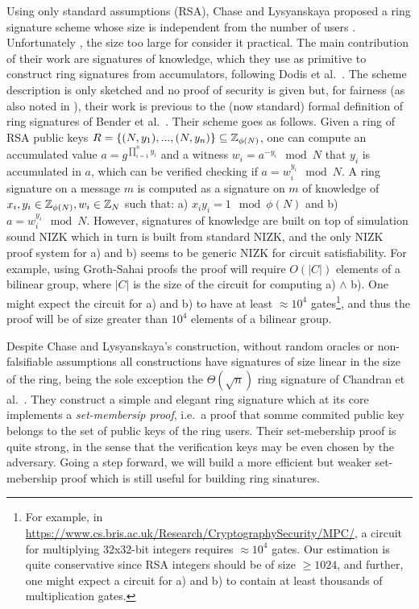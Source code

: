 Using only standard assumptions (RSA), Chase and Lysyanskaya proposed a ring signature scheme whose size is independent from the number of users \cite{C:ChaLys06}. Unfortunately , the size too large for consider it practical.
The main contribution of their work are
signatures of knowledge, which they use as primitive to construct ring signatures from accumulators, following Dodis et al.~\cite{EC:DKNS04}. The scheme description is only sketched and no proof of security is given but, for fairness (as also noted in \cite{AC:MalSch17}), their work is previous to the (now standard) formal definition of ring signatures of Bender et al.~\cite{TCC:BenKatMor06}. Their scheme goes as follows.
Given a ring of RSA public keys $R = \{(N,y_1),...,(N,y_n)\}\subseteq \mathbb{Z}_{\phi(N)}$, one can compute an accumulated value $a = g^{\prod_{i=1}^n y_i}$ and a witness $w_i = a^{-y_i} \mod N$ that $y_i$ is accumulated in $a$, which can be verified checking if $a = w_i^{y_i} \mod N$. A ring signature on a message $m$ is computed as a signature on $m$ of knowledge of $x_i,y_i\in \mathbb{Z}_{\phi(N)}, w_i\in \mathbb{Z}_N$ such that: a) $x_iy_i = 1 \mod \phi(N)$ and b)  $a = w_i^{y_i} \mod N$. However, signatures of knowledge are built on top of simulation sound NIZK which in turn is built from standard NIZK, and the only NIZK proof system for a) and b) seems to be generic NIZK for circuit satisfiability. For example, using Groth-Sahai proofs the proof will require $O(|C|)$ elements of a bilinear group, where $|C|$ is the size of the circuit for computing a) $\wedge$ b). One might expect the circuit for a) and b) to have at least $\approx 10^4$ gates\footnote{For example, in \url{https://www.cs.bris.ac.uk/Research/CryptographySecurity/MPC/}, a circuit for multiplying 32x32-bit integers requires $\approx 10^4$ gates. Our estimation is quite conservative since RSA integers should be of size $\geq 1024$, and further, one might expect a circuit for a) and b) to contain at least thousands of multiplication gates.}, and thus the proof will be of size greater than $10^4$ elements of a bilinear group. %

Despite Chase and Lysyanskaya's construction, without random oracles or non-falsifiable assumptions all constructions have signatures of size linear in the size of the ring, being the sole exception the $\Theta(\sqrt{n})$ ring signature of Chandran et al.~\cite{ICALP:ChaGroSah07}. They construct a simple and elegant ring signature which at its core implements a \emph{set-membersip proof}, i.e.~a proof that somme commited public key belongs to the set of public keys of the ring users. Their set-mebership proof is quite strong, in the sense that the verification keys may be even chosen by the adversary. Going a step forward, we will build a more efficient but weaker set-mebership proof which is still useful for building ring sinatures.

